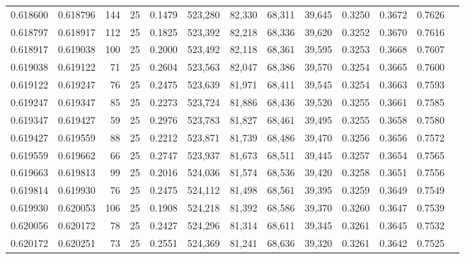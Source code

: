 \begin{tabular}{rrrrrrrrrrrrr}
0.618600 & 0.618796 &   144 &  25 &                                     0.1479 & 523,280 &  82,330 &  68,311 &  39,645 & 0.3250 & 0.3672 & 0.7626 \\
0.618797 & 0.618917 &   112 &  25 &                                     0.1825 & 523,392 &  82,218 &  68,336 &  39,620 & 0.3252 & 0.3670 & 0.7616 \\
0.618917 & 0.619038 &   100 &  25 &                                     0.2000 & 523,492 &  82,118 &  68,361 &  39,595 & 0.3253 & 0.3668 & 0.7607 \\
0.619038 & 0.619122 &    71 &  25 &                                     0.2604 & 523,563 &  82,047 &  68,386 &  39,570 & 0.3254 & 0.3665 & 0.7600 \\
0.619122 & 0.619247 &    76 &  25 &                                     0.2475 & 523,639 &  81,971 &  68,411 &  39,545 & 0.3254 & 0.3663 & 0.7593 \\
0.619247 & 0.619347 &    85 &  25 &                                     0.2273 & 523,724 &  81,886 &  68,436 &  39,520 & 0.3255 & 0.3661 & 0.7585 \\
0.619347 & 0.619427 &    59 &  25 &                                     0.2976 & 523,783 &  81,827 &  68,461 &  39,495 & 0.3255 & 0.3658 & 0.7580 \\
0.619427 & 0.619559 &    88 &  25 &                                     0.2212 & 523,871 &  81,739 &  68,486 &  39,470 & 0.3256 & 0.3656 & 0.7572 \\
0.619559 & 0.619662 &    66 &  25 &                                     0.2747 & 523,937 &  81,673 &  68,511 &  39,445 & 0.3257 & 0.3654 & 0.7565 \\
0.619663 & 0.619813 &    99 &  25 &                                     0.2016 & 524,036 &  81,574 &  68,536 &  39,420 & 0.3258 & 0.3651 & 0.7556 \\
0.619814 & 0.619930 &    76 &  25 &                                     0.2475 & 524,112 &  81,498 &  68,561 &  39,395 & 0.3259 & 0.3649 & 0.7549 \\
0.619930 & 0.620053 &   106 &  25 &                                     0.1908 & 524,218 &  81,392 &  68,586 &  39,370 & 0.3260 & 0.3647 & 0.7539 \\
0.620056 & 0.620172 &    78 &  25 &                                     0.2427 & 524,296 &  81,314 &  68,611 &  39,345 & 0.3261 & 0.3645 & 0.7532 \\
0.620172 & 0.620251 &    73 &  25 &                                     0.2551 & 524,369 &  81,241 &  68,636 &  39,320 & 0.3261 & 0.3642 & 0.7525 \\

\end{tabular}
